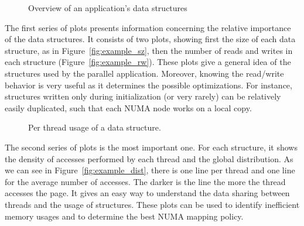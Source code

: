 \begin{figure}[htb]
    \centering
    \caption{Overview of an application's data structures}
\end{figure}

The first series of plots presents information concerning the relative
importance of the data structures. It consists of two plots, showing first the
size of each data structure, as in Figure~\ref{fig:example_sz}, then the
number of reads and writes  in each structure (Figure~\ref{fig:example_rw}). These plots give a
general idea of the structures used by the parallel application.
Moreover, knowing the read/write behavior is very
useful as it determines the possible optimizations. For instance, structures
written only during initialization (or very rarely) can be relatively easily
duplicated, such that each NUMA node works on a local copy.

\begin{figure}[htb]
    \centering
    \label{fig:example_plot1}
    \caption{Per thread usage of a data structure.}
\end{figure}
The second series of plots is the most important one. For each structure, it
shows the density of accesses performed by each thread and the
global distribution. As we can see in Figure~\ref{fig:example_dist}, there is
one line per thread and one line for the average number of accesses. The darker
is the line the more the thread accesses the page. It gives an easy way to
understand the data sharing between threads and the usage of structures. These
plots can be used to identify inefficient memory usages and to determine the best
NUMA mapping policy.



